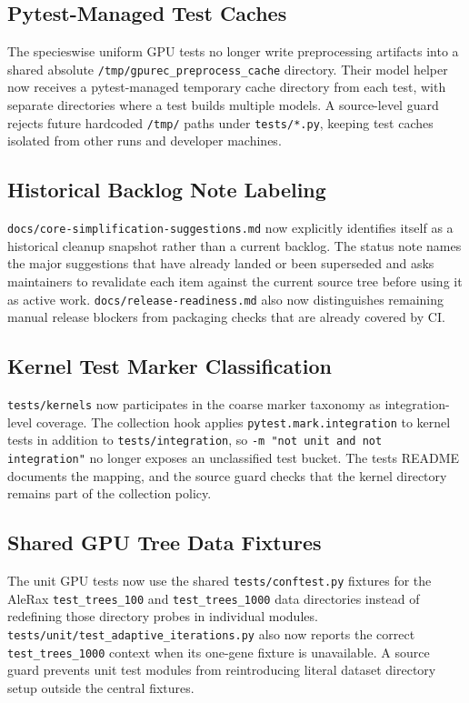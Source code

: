 \documentclass[11pt]{article}
\begin{document}
\subsection{Pytest-Managed Test Caches}

The specieswise uniform GPU tests no longer write preprocessing artifacts into
a shared absolute \texttt{/tmp/gpurec\_preprocess\_cache} directory.  Their
model helper now receives a pytest-managed temporary cache directory from each
test, with separate directories where a test builds multiple models.  A
source-level guard rejects future hardcoded \texttt{/tmp/} paths under
\texttt{tests/*.py}, keeping test caches isolated from other runs and
developer machines.

\subsection{Historical Backlog Note Labeling}

\texttt{docs/core-simplification-suggestions.md} now explicitly identifies
itself as a historical cleanup snapshot rather than a current backlog.  The
status note names the major suggestions that have already landed or been
superseded and asks maintainers to revalidate each item against the current
source tree before using it as active work.  \texttt{docs/release-readiness.md}
also now distinguishes remaining manual release blockers from packaging checks
that are already covered by CI.

\subsection{Kernel Test Marker Classification}

\texttt{tests/kernels} now participates in the coarse marker taxonomy as
integration-level coverage.  The collection hook applies
\texttt{pytest.mark.integration} to kernel tests in addition to
\texttt{tests/integration}, so \texttt{-m "not unit and not integration"} no
longer exposes an unclassified test bucket.  The tests README documents the
mapping, and the source guard checks that the kernel directory remains part of
the collection policy.

\subsection{Shared GPU Tree Data Fixtures}

The unit GPU tests now use the shared \texttt{tests/conftest.py} fixtures for
the AleRax \texttt{test\_trees\_100} and \texttt{test\_trees\_1000} data
directories instead of redefining those directory probes in individual modules.
\texttt{tests/unit/test\_adaptive\_iterations.py} also now reports the correct
\texttt{test\_trees\_1000} context when its one-gene fixture is unavailable.
A source guard prevents unit test modules from reintroducing literal dataset
directory setup outside the central fixtures.
\end{document}

